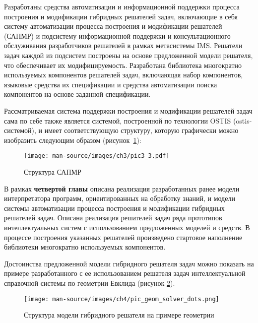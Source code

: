 \documentclass{thesisby}
\begin{document}
\vspace{-3mm}

Разработаны средства автоматизации и информационной поддержки процесса построения и модификации гибридных решателей задач, включающие в себя систему автоматизации процесса построения и модификации решателей (САПМР) и подсистему информационной поддержки и консультационного обслуживания разработчиков решателей в рамках метасистемы IMS. Решатели задач каждой из подсистем построены на основе предложенной модели решателя, что обеспечивает их модифицируемость. Разработана библиотека многократно используемых компонентов решателей задач, включающая набор компонентов, языковые средства их спецификации и средства автоматизации поиска компонентов на основе заданной спецификации.

Рассматриваемая система поддержки построения и модификации решателей задач сама по себе также является системой, построенной по технологии OSTIS (ostis-системой), и имеет соответствующую структуру, которую графически можно изобразить следующим образом (рисунок~\ref{fig:pic3_3}):

\begin{figure}[H]
    \centering
    \texttt{[image: man-source/images/ch3/pic3\_3.pdf]}
    \caption{Структура САПМР}
    \label{fig:pic3_3}
\end{figure}

\vspace{-3mm}

В рамках \textbf{четвертой главы} описана реализация разработанных ранее модели интерпретатора программ, ориентированных на обработку знаний, и модели системы автоматизации процесса построения и модификации гибридных решателей задач. Описана реализация решателей задач ряда прототипов интеллектуальных систем с использованием предложенных моделей и средств. В процессе построения указанных решателей произведено стартовое наполнение библиотеки многократно используемых компонентов. 

Достоинства предложенной модели гибридного решателя задач можно показать на примере разработанного с ее использованием решателя задач интеллектуальной справочной системы по геометрии Евклида (рисунок \ref{fig:pic_geom_solver}).

\begin{figure}[H]
    \centering
    \texttt{[image: man-source/images/ch4/pic\_geom\_solver\_dots.png]}
    \caption{Структура модели гибридного решателя на примере геометрии}
    \label{fig:pic_geom_solver}
\end{figure}
\end{document}

